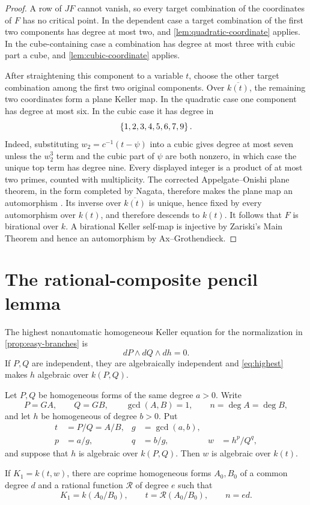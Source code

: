 \documentclass[11pt,reqno]{amsart}
\begin{document}
\begin{proof}
A row of \(JF\) cannot vanish, so every target combination of the
coordinates of \(F\) has no critical point.  In the dependent case a target
combination of the first two components has degree at most two, and
\cref{lem:quadratic-coordinate} applies.  In the cube-containing case a
combination has degree at most three with cubic part a cube, and
\cref{lem:cubic-coordinate} applies.

After straightening this component to a variable \(t\), choose the other
target combination among the first two original components.  Over
\(\overline{k(t)}\), the remaining two coordinates form a plane Keller map.
In the quadratic case one component has degree at most six.  In the cubic
case it has degree in
\[
\left\{1,2,3,4,5,6,7,9\right\}.
\]
Indeed, substituting \(w_2=c^{-1}(t-\psi)\) into a cubic gives degree at most
seven unless the \(w_2^3\) term and the cubic part of \(\psi\) are both
nonzero, in which case the unique top term has degree nine.  Every displayed
integer is a product of at most two primes, counted with multiplicity.
The corrected Appelgate--Onishi plane theorem, in the form completed by
Nagata, therefore makes the plane map an automorphism
\cite{appelgateOnishi1985,nagata1988two}.  Its inverse over
\(\overline{k(t)}\) is unique, hence fixed by every automorphism over
\(k(t)\), and therefore descends to \(k(t)\).  It follows that \(F\) is
birational over \(k\).  A birational Keller self-map is injective by
Zariski's Main Theorem and hence an automorphism by Ax--Grothendieck.
\end{proof}

\section{The rational-composite pencil lemma}
\label{sec:pencil}

The highest nonautomatic homogeneous Keller equation for the normalization
in \cref{prop:easy-branches} is
\begin{equation}
\label{eq:highest}
dP\wedge dQ\wedge dh=0.
\end{equation}
If \(P,Q\) are independent, they are algebraically independent and
\eqref{eq:highest} makes \(h\) algebraic over \(k(P,Q)\).

\begin{lemma}
\label{lem:weighted-field}
Let \(P,Q\) be homogeneous forms of the same degree \(a>0\).  Write
\[
P=GA,\qquad Q=GB,\qquad \gcd(A,B)=1,
\qquad n=\deg A=\deg B,
\]
and let \(h\) be homogeneous of degree \(b>0\).  Put
\[
  \begin{aligned}
  t&=P/Q=A/B, & g&=\gcd(a,b),\\
  p&=a/g, & q&=b/g, & w&=h^p/Q^q,
  \end{aligned}
\]
and suppose that \(h\) is algebraic over \(k(P,Q)\).  Then \(w\) is
algebraic over \(k(t)\).

If \(K_1=k(t,w)\), there are coprime homogeneous forms \(A_0,B_0\) of a
common degree \(d\) and a rational function \(\mathcal R\) of degree \(e\)
such that
\[
K_1=k(A_0/B_0),\qquad t=\mathcal R(A_0/B_0),
\qquad n=ed.
\]
\end{lemma}
\end{document}

